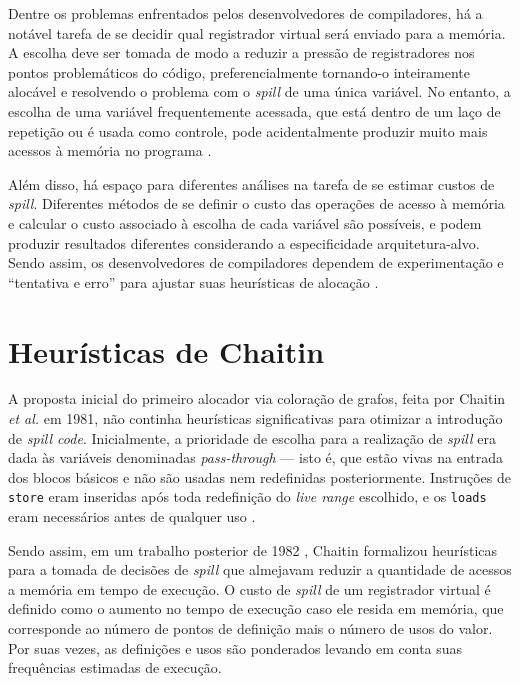 \documentclass[
	12pt,				%
	openright,			%
	twoside,			%
	a4paper,			%
	tcc,			%
	]{ABNT-DC-UEL}
\begin{document}
Dentre os problemas enfrentados pelos desenvolvedores de compiladores, há a notável tarefa de se decidir qual registrador virtual será enviado para a memória. A escolha deve ser tomada de modo a reduzir a pressão de registradores nos pontos problemáticos do código, preferencialmente tornando-o inteiramente alocável e resolvendo o problema com o \textit{spill} de uma única variável. No entanto, a escolha de uma variável frequentemente acessada, que está dentro de um laço de repetição ou é usada como controle, pode acidentalmente produzir muito mais acessos à memória no programa \cite{chaitin:82, bernstein:89}.

Além disso, há espaço para diferentes análises na tarefa de se estimar custos de \textit{spill}. Diferentes métodos de se definir o custo das operações de acesso à memória e calcular o custo associado à escolha de cada variável são possíveis, e podem produzir resultados diferentes considerando a especificidade arquitetura-alvo. Sendo assim, os desenvolvedores de compiladores dependem de experimentação e ``tentativa e erro'' para ajustar suas heurísticas de alocação \cite{amarasinghe:03}.

\section{Heurísticas de Chaitin}

A proposta inicial do primeiro alocador via coloração de grafos, feita por Chaitin \textit{et al.} em 1981, não continha heurísticas significativas para otimizar a introdução de \textit{spill code}. Inicialmente, a prioridade de escolha para a realização de \textit{spill} era dada às variáveis denominadas \textit{pass-through} --- isto é, que estão vivas na entrada dos blocos básicos e não são usadas nem redefinidas posteriormente. Instruções de \texttt{store} eram inseridas após toda redefinição do \textit{live range} escolhido, e os \texttt{loads} eram necessários antes de qualquer uso \cite{chaitin:81}.

Sendo assim, em um trabalho posterior de 1982 \cite{chaitin:82}, Chaitin formalizou heurísticas para a tomada de decisões de \textit{spill} que almejavam reduzir a quantidade de acessos a memória em tempo de execução. O custo de \textit{spill} de um registrador virtual é definido como o aumento no tempo de execução caso ele resida em memória, que corresponde ao número de pontos de definição mais o número de usos do valor. Por suas vezes, as definições e usos são ponderados levando em conta suas frequências estimadas de execução.
\end{document}
